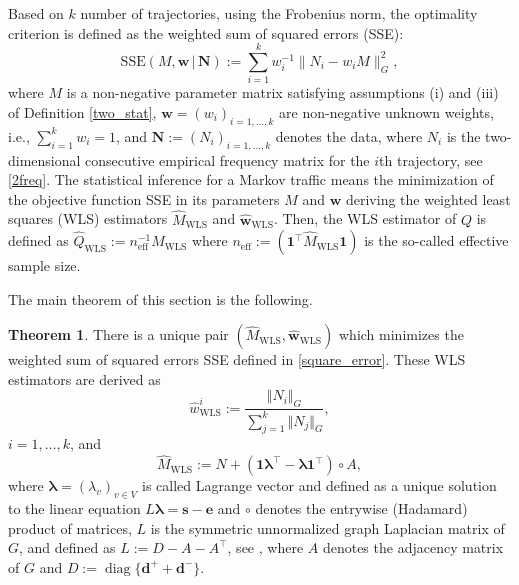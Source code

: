 \documentclass[b5paper,12pt]{report}
\theoremstyle{definition}
\newtheorem{Thm}{Theorem}
\newcommand{\bd}{\boldsymbol{d}}
\newcommand{\be}{\boldsymbol{e}}
\newcommand{\bs}{\boldsymbol{s}}
\newcommand{\bw}{\boldsymbol{w}}
\newcommand{\bN}{\boldsymbol{N}}
\newcommand{\blambda}{\boldsymbol{\lambda}}
\newcommand{\diag}{\operatorname{diag}}
\begin{document}
Based on $k$ number of trajectories, using the Frobenius norm, the optimality criterion is defined as the weighted sum of squared errors (SSE):
\begin{equation}\label{square_error}
    \text{SSE}(M,\bw\,|\,\bN) :=  \sum_{i=1}^k w_i^{-1} 
    \|N_i- w_i M\|_G^2,
\end{equation}
where $M$ is a non-negative parameter matrix satisfying assumptions (i) and (iii) of Definition \ref{two_stat}, $\bw=(w_i)_{i=1,\ldots,k}$ are non-negative unknown weights, i.e., $\sum_{i=1}^k w_i=1$, and $\bN:=(N_i)_{i=1,\ldots,k}$ denotes the data, where $N_i$ is the two-dimensional consecutive empirical frequency matrix for the $i$th trajectory, see \eqref{2freq}. The statistical inference for a Markov traffic means the minimization of the objective function SSE in its parameters $M$ and $\bw$ deriving the weighted least squares (WLS) estimators $\widehat{M}_{\textrm{WLS}}$ and $\widehat{\bw}_{\textrm{WLS}}$. Then, the WLS estimator of $Q$ is defined as $\widehat{Q}_{\textrm{WLS}}:= n_{\textrm{eff}}^{-1}\widehat{M}_{\textrm{WLS}}$ where $n_{\textrm{eff}} := (\textbf{1}^\top \widehat{M}_{\textrm{WLS}}\textbf{1})$ is the so-called effective sample size.

The main theorem of this section is the following.

\begin{Thm}\label{main_thm}
There is a unique pair $(\widehat{M}_{\textrm{WLS}},\widehat{\bw}_{\textrm{WLS}})$ which minimizes the weighted sum of squared errors SSE defined in \eqref{square_error}. These WLS estimators are derived as
\[
    \widehat{w}^i_{\textrm{WLS}} :=  
    \frac{\Vert N_i\Vert_G}{\sum_{j=1}^k \Vert N_j\Vert_G},
\]
$i=1,\ldots,k$, and
\[
    \widehat{M}_{\textrm{WLS}}:= N+(\textbf{1}\blambda^\top -\blambda\textbf{1}^\top)\circ A,
\] 
where $\blambda = (\lambda_v)_{v \in V}$ is called Lagrange vector and defined as a unique solution to the linear equation $L\blambda = \bs-\be$ and $\circ$ denotes the entrywise (Hadamard) product of matrices, $L$ is the symmetric unnormalized graph Laplacian matrix of $G$, and defined as $L:= D - A-A^\top$, see \cite{von2007tutorial}, where $A$ denotes the adjacency matrix of $G$ and $D:=\diag\{\bd^{+} + \bd^{-}\} $.
\end{Thm}
\end{document}
